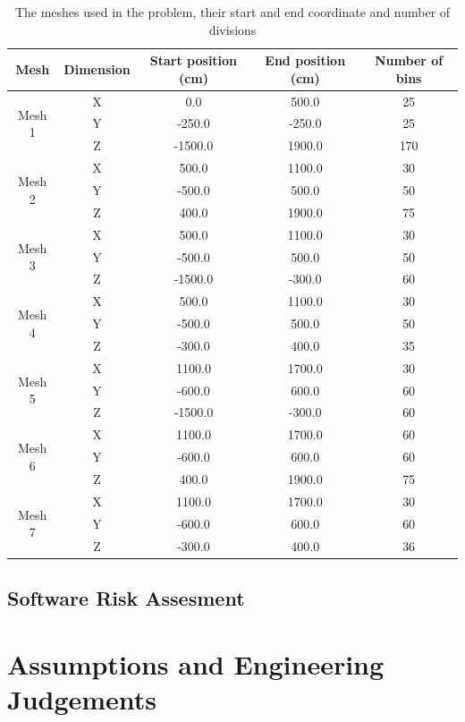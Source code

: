 \documentclass[12pt]{article}
\begin{document}
\begin{centering}
 \begin{table}[ht!]
  \begin{tabular}{c | c | c | c | c}
  \hline 
  Mesh & Dimension & Start position (cm) & End position (cm) & Number of bins\\
  \hline 
  \multirow{3}{*}{Mesh 1} & X & 0.0 & 500.0 & 25 \\ & Y & -250.0 & -250.0 & 25 \\
  & Z & -1500.0 & 1900.0 & 170 \\
  \hline
  \multirow{3}{*}{Mesh 2} & X & 500.0 & 1100.0 & 30 \\ & Y & -500.0 & 500.0 & 50\\
  & Z & 400.0 & 1900.0 & 75 \\
  \hline
  \multirow{3}{*}{Mesh 3} & X & 500.0 & 1100.0 & 30 \\ & Y & -500.0 & 500.0 & 50 \\
  & Z & -1500.0 & -300.0 & 60 \\
  \hline
  \multirow{3}{*}{Mesh 4} & X & 500.0 & 1100.0 & 30 \\ & Y & -500.0 & 500.0 & 50 \\
  & Z & -300.0 & 400.0 & 35 \\
  \hline
  \multirow{3}{*}{Mesh 5} & X & 1100.0 & 1700.0 & 30 \\ & Y & -600.0 & 600.0 & 60 \\
  & Z & -1500.0 & -300.0 & 60 \\
  \hline
  \multirow{3}{*}{Mesh 6} & X & 1100.0 & 1700.0 & 60 \\ & Y & -600.0 & 600.0 & 60 \\
  & Z & 400.0 & 1900.0 & 75\\
  \hline
  \multirow{3}{*}{Mesh 7} & X & 1100.0 & 1700.0 & 30 \\ & Y & -600.0 & 600.0 & 60 \\
  & Z & -300.0 & 400.0 & 36 
  \end{tabular}
 \caption{The meshes used in the problem, their start and end coordinate and
          number of divisions}
 \label{table:mesh_sizes}
 \end{table}
\end{centering}

\subsection{Software Risk Assesment}
\newpage
\section{Assumptions and Engineering Judgements}
\end{document}
